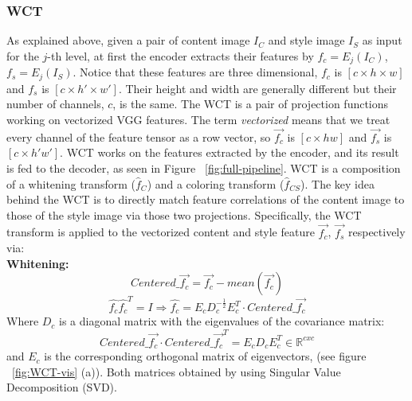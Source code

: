 \subsubsection{WCT} As explained above, given a pair of content image $I_C$ and style image $I_S$ as input for the $j$-th level, at first the encoder extracts their features by $f_c = E_j(I_C)$, $f_s = E_j(I_S)$. Notice that these features are three dimensional, $f_c$ is $[c\times h \times w]$ and $f_s$ is $[c\times h' \times w']$. Their height and width are generally different but their number of channels, $c$, is the same. The WCT is a pair of projection functions working on vectorized VGG features. The term \textit{vectorized} means that we treat every channel of the feature tensor as a row vector, so $\vec{f_c}$ is $[c \times hw]$ and $\vec{f_s}$ is $[c \times h'w']$. WCT works on the features extracted by the encoder, and its result is fed to the decoder, as seen in Figure ~\ref{fig:full-pipeline}. WCT is a composition of a whitening transform ($\hat{f}_C$) and a coloring transform ($\hat{f}_{CS}$). The key idea behind the WCT is to directly match feature correlations of the content image to those of the style image via those two projections. Specifically, the WCT transform is applied to the vectorized content and style feature $\vec{f_c}$, $\vec{f_s}$ respectively via:\\

\textbf{Whitening:}\\
\begin{equation}
Centered\_\vec{f_c} = \vec{f_c} - mean(\vec{f_c})
\end{equation}
\begin{equation}
\hat{f_c}\hat{f_c}^T=I \Rightarrow  \hat{f_c} = E_cD_c^{-\frac{1}{2}}E_c^T \cdot Centered\_\vec{f_c} 
\end{equation}
Where $D_c$ is a diagonal matrix with the eigenvalues of the covariance matrix:
\begin{equation*}
Centered\_\vec{f_c} \cdot Centered\_\vec{f_c}^T=E_c D_c E_c^T \in\mathbb{R}^{cxc}
\end{equation*}
and $E_c$ is the corresponding orthogonal matrix of eigenvectors, (see figure ~\ref{fig:WCT-vis} (a)). Both matrices obtained by using Singular Value Decomposition (SVD).\\

